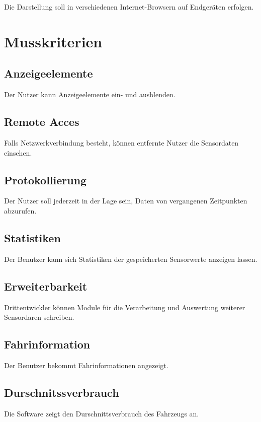 \documentclass[pflichtenheft.tex]{subfiles}
\begin{document}
Die Darstellung soll in verschiedenen Internet-Browsern auf Endgeräten erfolgen. 

\section{Musskriterien}



\subsection{\mknr Anzeigeelemente} Der Nutzer kann Anzeigeelemente ein- und ausblenden.

\subsection{\mknr Remote Acces} Falls Netzwerkverbindung besteht, können entfernte Nutzer die Sensordaten einsehen.

\subsection{\mknr Protokollierung} Der Nutzer soll jederzeit in der Lage sein, Daten von vergangenen Zeitpunkten abzurufen.

\subsection{\mknr Statistiken} Der Benutzer kann sich Statistiken der gespeicherten Sensorwerte anzeigen lassen.

\subsection{\mknr Erweiterbarkeit} Drittentwickler können Module für die Verarbeitung und Auswertung weiterer Sensordaren schreiben.



\subsection{\mknr Fahrinformation} Der Benutzer bekommt Fahrinformationen angezeigt.

\subsection{\mknr Durschnitssverbrauch} Die Software zeigt den Durschnittsverbrauch des Fahrzeugs an. 
\end{document}
